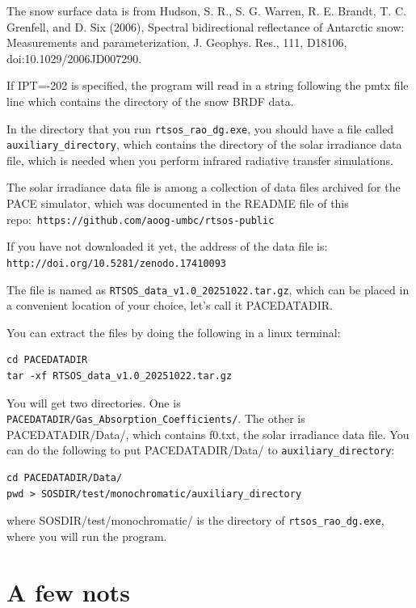 \documentclass[10pt,letterpaper]{article}
\begin{document}
The snow surface data is from
Hudson, S. R., S. G. Warren, R. E. Brandt, T. C. Grenfell, and D. Six (2006), Spectral bidirectional reflectance of Antarctic snow: Measurements and parameterization, J. Geophys. Res., 111, D18106, doi:10.1029/2006JD007290.

If IPT=-202 is specified, the program will read in a string following the pmtx file line which contains the directory of the snow BRDF data.

In the directory that you run \verb!rtsos_rao_dg.exe!, you should have a file called \verb!auxiliary_directory!, which contains the directory of the solar irradiance data file, which is needed when you perform infrared radiative transfer simulations.

The solar irradiance data file is among a collection of data files archived for the PACE simulator, which was documented in the README file of this repo:\
\verb!https://github.com/aoog-umbc/rtsos-public!

If you have not downloaded it yet, the address of the data file is: \\
\verb!http://doi.org/10.5281/zenodo.17410093!

The file is named as \verb!RTSOS_data_v1.0_20251022.tar.gz!, which can be placed in a convenient location of your choice, let's call it PACEDATADIR.

You can extract the files by doing the following in a linux terminal:

\begin{verbatim}
cd PACEDATADIR
tar -xf RTSOS_data_v1.0_20251022.tar.gz
\end{verbatim}

You will get two directories. One is \verb!PACEDATADIR/Gas_Absorption_Coefficients/!. The other is PACEDATADIR/Data/, which contains f0.txt, the solar irradiance data file. You can do the following to put PACEDATADIR/Data/ to \verb!auxiliary_directory!: \\

\begin{verbatim}
cd PACEDATADIR/Data/ 
pwd > SOSDIR/test/monochromatic/auxiliary_directory
\end{verbatim}

\noindent where SOSDIR/test/monochromatic/ is the directory of \verb!rtsos_rao_dg.exe!, where you will run the program.

\section{A few nots}
\end{document}
